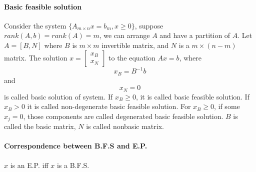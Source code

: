             \paragraph{Basic feasible solution}
                Consider the system $\{A_{m\times n}x=b_m, x\ge 0\}$, suppose $rank(A, b) = rank(A) =m$, we can arrange $A$ and have a partition of $A$. Let $A=[B, N]$ where $B$ is $m\times m$ invertible matrix, and $N$ is a $m\times (n-m)$ matrix. The solution $x=\left[\begin{matrix}x_B\\x_N\end{matrix}\right]$ to the equation $Ax=b$, where
                \begin{equation}
                    x_B = B^{-1}b \nonumber
                \end{equation}
                and
                \begin{equation}
                    x_N = 0 \nonumber
                \end{equation}
                is called basic solution of system. If $x_B \ge 0$, it is called basic feasible solution. If $x_B > 0$ it is called non-degenerate basic feasible solution. For $x_B \ge 0$, if some $x_j = 0$, those components are called degenerated basic feasible solution. $B$ is called the basic matrix, $N$ is called nonbasic matrix.

            \paragraph{Correspondence between B.F.S and E.P.}
                \begin{theorem}
                    $x$ is an E.P. iff $x$ is a B.F.S.
                \end{theorem}
                
